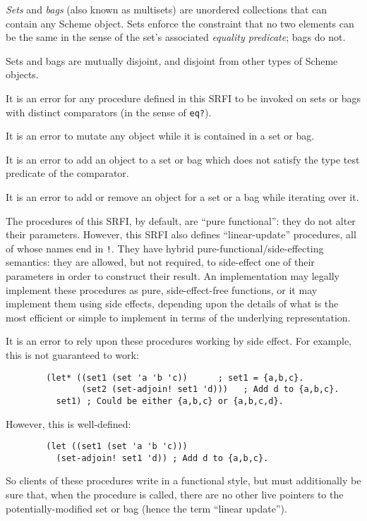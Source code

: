 \emph{Sets} and \emph{bags} (also known as multisets) are unordered
collections that can contain any Scheme object. Sets enforce the
constraint that no two elements can be the same in the sense of the
set's associated \emph{equality predicate}; bags do not.



Sets and bags are mutually disjoint, and disjoint from other types of
Scheme objects.

It is an error for any procedure defined in this SRFI to be invoked on
sets or bags with distinct comparators (in the sense of \texttt{eq?}).

It is an error to mutate any object while it is contained in a set or
bag.

It is an error to add an object to a set or bag which does not satisfy
the type test predicate of the comparator.

It is an error to add or remove an object for a set or a bag while
iterating over it.

The procedures of this SRFI, by default, are ``pure functional'':
they do not alter their parameters. However, this SRFI also defines
``linear-update'' procedures, all of whose names end in \texttt{!}. They
have hybrid pure-functional/side-effecting semantics: they are allowed,
but not required, to side-effect one of their parameters in order to
construct their result. An implementation may legally implement these
procedures as pure, side-effect-free functions, or it may implement them
using side effects, depending upon the details of what is the most
efficient or simple to implement in terms of the underlying
representation.

It is an error to rely upon these procedures working by side effect. For
example, this is not guaranteed to work:

\begin{verbatim}
        (let* ((set1 (set 'a 'b 'c))      ; set1 = {a,b,c}.
               (set2 (set-adjoin! set1 'd)))   ; Add d to {a,b,c}.
          set1) ; Could be either {a,b,c} or {a,b,c,d}.
\end{verbatim}

However, this is well-defined:

\begin{verbatim}
        (let ((set1 (set 'a 'b 'c)))
          (set-adjoin! set1 'd)) ; Add d to {a,b,c}.
\end{verbatim}

So clients of these procedures write in a functional style, but must
additionally be sure that, when the procedure is called, there are no
other live pointers to the potentially-modified set or bag (hence the
term ``linear update'').

